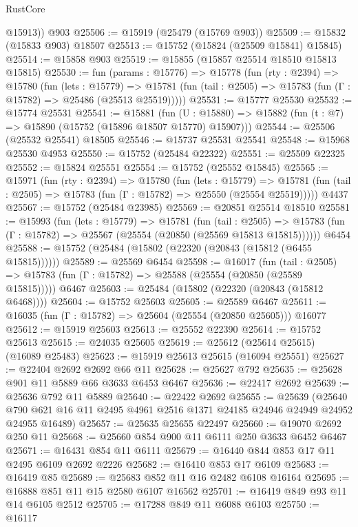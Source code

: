 \begin{lexlean}{RustCore}
\begin{coremodule}
        @15913))
    @903
@25506 := @15919 (@25479 (@15769 @903))
@25509 := @15832 (@15833 @903) @18507
@25513 := @15752 (@15824 (@25509 @15841) @15845)
@25514 := @15858 @903
@25519 := @15855 (@15857 @25514 @18510 @15813 @15815)
@25530 := fun (params : @15776) =>
  @15778
    (fun (rty : @2394) =>
    @15780
      (fun (lets : @15779) =>
      @15781 (fun (tail : @2505) => @15783 (fun (Γ : @15782) => @25486 (@25513 @25519)))))
@25531 := @15777 @25530
@25532 := @15774 @25531
@25541 := @15881
    (fun (U : @15880) => @15882 (fun (t : @7) => @15890 (@15752 (@15896 @18507 @15770) @15907)))
@25544 := @25506 (@25532 @25541) @18505
@25546 := @15737 @25531 @25541
@25548 := @15968 @25530 @4953
@25550 := @15752 (@25484 @22322)
@25551 := @25509 @22325
@25552 := @15824 @25551
@25554 := @15752 (@25552 @15845)
@25565 := @15971
    (fun (rty : @2394) =>
    @15780
      (fun (lets : @15779) =>
      @15781 (fun (tail : @2505) => @15783 (fun (Γ : @15782) => @25550 (@25554 @25519)))))
    @4437
@25567 := @15752 (@25484 @23985)
@25569 := @20851 @25514 @18510
@25581 := @15993
    (fun (lets : @15779) =>
    @15781
      (fun (tail : @2505) =>
      @15783 (fun (Γ : @15782) => @25567 (@25554 (@20850 (@25569 @15813 @15815))))))
    @6454
@25588 := @15752 (@25484 (@15802 (@22320 (@20843 (@15812 (@6455 @15815))))))
@25589 := @25569 @6454
@25598 := @16017
    (fun (tail : @2505) => @15783 (fun (Γ : @15782) => @25588 (@25554 (@20850 (@25589 @15815)))))
    @6467
@25603 := @25484 (@15802 (@22320 (@20843 (@15812 @6468))))
@25604 := @15752 @25603
@25605 := @25589 @6467
@25611 := @16035 (fun (Γ : @15782) => @25604 (@25554 (@20850 @25605))) @16077
@25612 := @15919 @25603
@25613 := @25552 @22390
@25614 := @15752 @25613
@25615 := @24035 @25605
@25619 := @25612 (@25614 @25615) (@16089 @25483)
@25623 := @15919 @25613 @25615 (@16094 @25551)
@25627 := @22404 @2692 @2692 @66 @11
@25628 := @25627 @792
@25635 := @25628 @901 @11 @5889 @66 @3633 @6453 @6467
@25636 := @22417 @2692
@25639 := @25636 @792 @11 @5889
@25640 := @22422 @2692
@25655 := @25639
    (@25640 @790 @621 @16 @11 @2495 @4961 @2516 @1371 @24185 @24946 @24949 @24952 @24955 @16489)
@25657 := @25635 @25655 @22497
@25660 := @19070 @2692 @250 @11
@25668 := @25660 @854 @900 @11 @6111 @250 @3633 @6452 @6467
@25671 := @16431 @854 @11 @6111
@25679 := @16440 @844 @853 @17 @11 @2495 @6109 @2692 @2226
@25682 := @16410 @853 @17 @6109
@25683 := @16419 @85
@25689 := @25683 @852 @11 @16 @2482 @6108 @16164
@25695 := @16888 @851 @11 @15 @2580 @6107 @16562
@25701 := @16419 @849 @93 @11 @14 @6105 @2512
@25705 := @17288 @849 @11 @6088 @6103
@25750 := @16117

\end{coremodule}
\end{lexlean}
